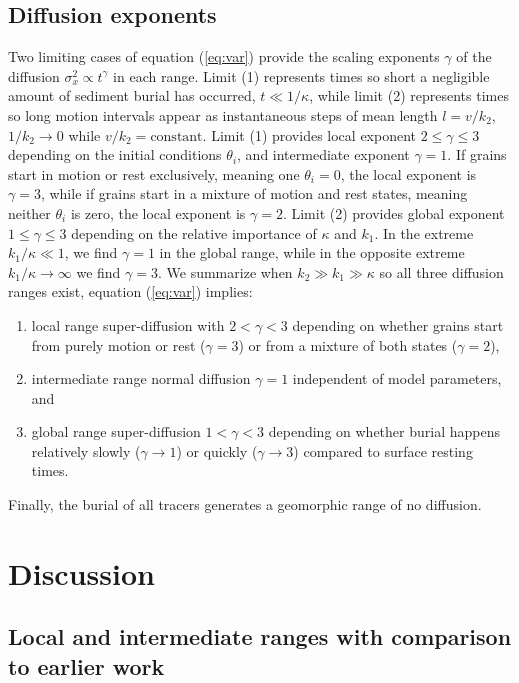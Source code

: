 \subsection{Diffusion exponents}

Two limiting cases of equation (\ref{eq:var}) provide the scaling exponents $\gamma$ of the diffusion $\sigma_x^2 \propto t^\gamma$ in each range. Limit (1) represents times so short a negligible amount of sediment burial has occurred, $t\ll 1/\kappa$, while limit (2) represents times so long motion intervals appear as instantaneous steps of mean length $l=v/k_2$, $1/k_2 \rightarrow 0$ while $v/k_2 = \text{constant}$.
Limit (1) provides local exponent $2 \leq \gamma \leq 3$ depending on the initial conditions $\theta_i$, and intermediate exponent $\gamma=1$.
If grains start in motion or rest exclusively, meaning one $\theta_i = 0$, the local exponent is $\gamma=3$, while if grains start in a mixture of motion and rest states, meaning neither $\theta_i$ is zero, the local exponent is $\gamma=2$.
Limit (2) provides global exponent $1 \leq \gamma \leq 3$ depending on the relative importance of $\kappa$ and $k_1$.
In the extreme $k_1/\kappa \ll 1$, we find $\gamma=1$ in the global range, while in the opposite extreme $k_1/\kappa \rightarrow \infty$ we find $\gamma=3$.
We summarize when $k_2\gg k_1 \gg \kappa$ so all three diffusion ranges exist, equation (\ref{eq:var}) implies:
\begin{enumerate}
	\item local range super-diffusion with $2<\gamma<3$ depending on whether grains start from purely motion or rest ($\gamma=3$) or from a mixture of both states ($\gamma=2$),
	\item intermediate range normal diffusion $\gamma=1$ independent of model parameters, and
	\item global range super-diffusion $1<\gamma<3$ depending on whether burial happens relatively slowly ($\gamma \rightarrow 1$) or quickly ($\gamma \rightarrow 3$) compared to surface resting times.
\end{enumerate}
Finally, the burial of all tracers generates a geomorphic range of no diffusion.

\section{Discussion}
\label{sec:discussion}

\subsection{Local and intermediate ranges with comparison to earlier work}

